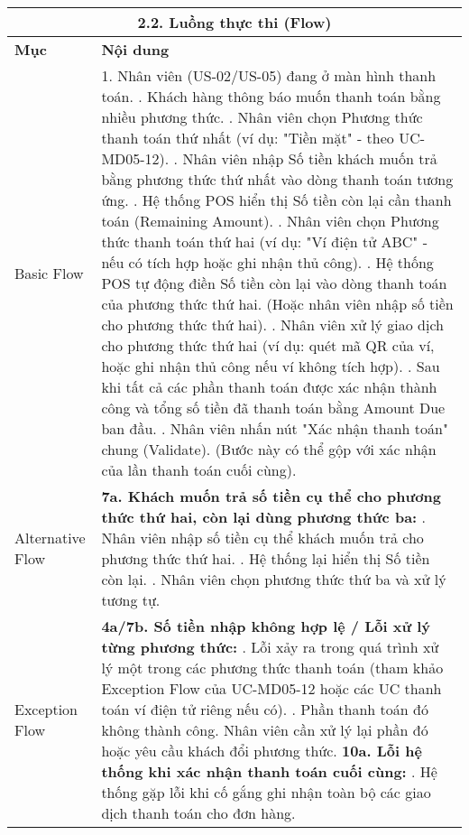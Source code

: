 \begin{longtable}{|m{4cm}|p{11cm}|}
\multicolumn{2}{|c|}{\textbf{2.2. Luồng thực thi (Flow)}} \\
\hline
\textbf{Mục} & \textbf{Nội dung} \\
\hline
Basic Flow & 1. Nhân viên (US-02/US-05) đang ở màn hình thanh toán. \newline 2. Khách hàng thông báo muốn thanh toán bằng nhiều phương thức. \newline 3. Nhân viên chọn Phương thức thanh toán thứ nhất (ví dụ: "Tiền mặt" - theo UC-MD05-12). \newline 4. Nhân viên nhập Số tiền khách muốn trả bằng phương thức thứ nhất vào dòng thanh toán tương ứng. \newline 5. Hệ thống POS hiển thị Số tiền còn lại cần thanh toán (Remaining Amount). \newline 6. Nhân viên chọn Phương thức thanh toán thứ hai (ví dụ: "Ví điện tử ABC" - nếu có tích hợp hoặc ghi nhận thủ công). \newline 7. Hệ thống POS tự động điền Số tiền còn lại vào dòng thanh toán của phương thức thứ hai. (Hoặc nhân viên nhập số tiền cho phương thức thứ hai). \newline 8. Nhân viên xử lý giao dịch cho phương thức thứ hai (ví dụ: quét mã QR của ví, hoặc ghi nhận thủ công nếu ví không tích hợp). \newline 9. Sau khi tất cả các phần thanh toán được xác nhận thành công và tổng số tiền đã thanh toán bằng Amount Due ban đầu. \newline 10. Nhân viên nhấn nút "Xác nhận thanh toán" chung (Validate). (Bước này có thể gộp với xác nhận của lần thanh toán cuối cùng). \\
\hline
Alternative Flow & \textbf{7a. Khách muốn trả số tiền cụ thể cho phương thức thứ hai, còn lại dùng phương thức ba:} \newline    1. Nhân viên nhập số tiền cụ thể khách muốn trả cho phương thức thứ hai. \newline    2. Hệ thống lại hiển thị Số tiền còn lại. \newline    3. Nhân viên chọn phương thức thứ ba và xử lý tương tự. \\
\hline
Exception Flow & \textbf{4a/7b. Số tiền nhập không hợp lệ / Lỗi xử lý từng phương thức:} \newline    1. Lỗi xảy ra trong quá trình xử lý một trong các phương thức thanh toán (tham khảo Exception Flow của UC-MD05-12 hoặc các UC thanh toán ví điện tử riêng nếu có). \newline    2. Phần thanh toán đó không thành công. Nhân viên cần xử lý lại phần đó hoặc yêu cầu khách đổi phương thức. \newline \textbf{10a. Lỗi hệ thống khi xác nhận thanh toán cuối cùng:} \newline    1. Hệ thống gặp lỗi khi cố gắng ghi nhận toàn bộ các giao dịch thanh toán cho đơn hàng. \\

\end{longtable}

